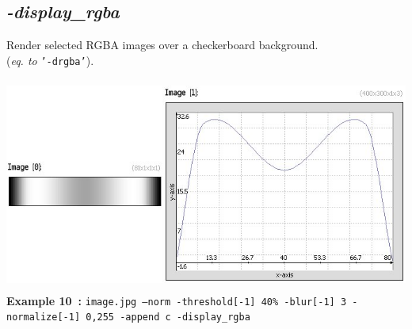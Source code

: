 \documentclass[a4paper,11pt,twoside]{book}
\begin{document}
\subsection{\emph{-display\_rgba} }\vspace*{-0.5em}
Render selected RGBA images over a checkerboard background.
~\\(\emph{eq. to} {\small \texttt{'-drgba'}}).
\begin{center}\includegraphics[keepaspectratio=true,height=7cm,width=\textwidth]{img/gmic_def10.jpg}\\
{\footnotesize \textbf{Example 10~:} \texttt{image.jpg --norm -threshold[-1] 40\% -blur[-1] 3 -normalize[-1] 0,255 -append c -display\_rgba}}
\end{center}
\end{document}
